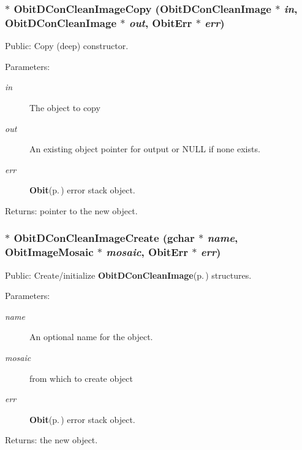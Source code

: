 \subsubsection{$\ast$ Obit\-DCon\-Clean\-Image\-Copy ({\bf Obit\-DCon\-Clean\-Image} $\ast$ {\em in}, {\bf Obit\-DCon\-Clean\-Image} $\ast$ {\em out}, {\bf Obit\-Err} $\ast$ {\em err})}\label{ObitDConCleanImage_8h_a7}


Public: Copy (deep) constructor. 

\begin{Desc}
\item[Parameters:]
\begin{description}
\item[{\em in}]The object to copy \item[{\em out}]An existing object pointer for output or NULL if none exists. \item[{\em err}]{\bf Obit}{\rm (p.\,\pageref{structObit})} error stack object. \end{description}
\end{Desc}
\begin{Desc}
\item[Returns:]pointer to the new object. \end{Desc}
\subsubsection{$\ast$ Obit\-DCon\-Clean\-Image\-Create (gchar $\ast$ {\em name}, {\bf Obit\-Image\-Mosaic} $\ast$ {\em mosaic}, {\bf Obit\-Err} $\ast$ {\em err})}\label{ObitDConCleanImage_8h_a5}


Public: Create/initialize {\bf Obit\-DCon\-Clean\-Image}{\rm (p.\,\pageref{structObitDConCleanImage})} structures. 

\begin{Desc}
\item[Parameters:]
\begin{description}
\item[{\em name}]An optional name for the object. \item[{\em mosaic}]from which to create object \item[{\em err}]{\bf Obit}{\rm (p.\,\pageref{structObit})} error stack object. \end{description}
\end{Desc}
\begin{Desc}
\item[Returns:]the new object. \end{Desc}
